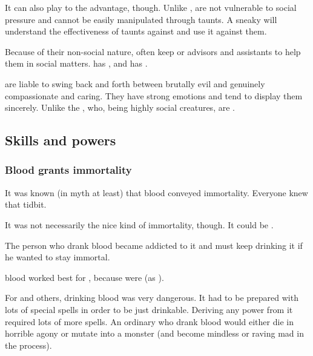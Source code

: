 It can also play to the \psp{\dragons}{} advantage, though. 
Unlike \resphain, \dragons{} are not vulnerable to social pressure and cannot be easily manipulated through taunts. 
A sneaky \dragon{} will understand the effectiveness of taunts against \resphain{} and use it against them. 

Because of their non-social nature, \dragonlords{} often keep \scathaese{} or  advisors and assistants to help them in social matters. 
\Secherdamon{} has \LocarPsyrex, and \Ishnaruchaefir{} has \Criseis. 

\Dragons{} are liable to swing back and forth between brutally evil and genuinely compassionate and caring. 
They have strong emotions and tend to display them sincerely. 
Unlike the \resphain{}, who, being highly social creatures, are . 










\subsection{Skills and powers}





\subsubsection{Blood grants immortality}
It was known (in myth at least) that \draconian blood conveyed immortality.
Everyone knew that tidbit.

It was not necessarily the nice kind of immortality, though. 
It could be .

The person who drank \draconian blood became addicted to it and must keep drinking it if he wanted to stay immortal. 

\Dragon blood worked best for \scathae, because \scathae were  (as ). 

For \humans and others, drinking \draconian blood was very dangerous.
It had to be prepared with lots of special spells in order to be just drinkable.
Deriving any power from it required lots of more spells. 
An ordinary \human who drank \draconian blood would either die in horrible agony or mutate into a monster (and become mindless or raving mad in the process). 






